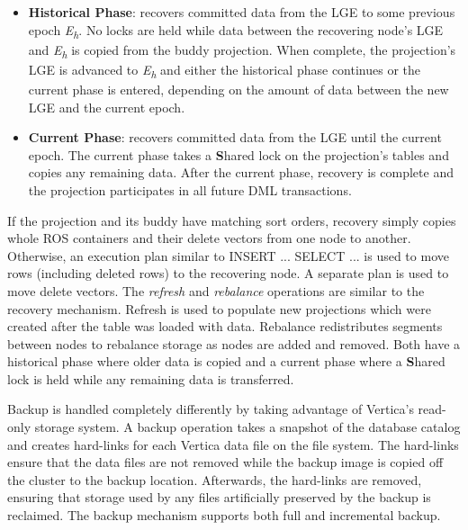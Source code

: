 \documentclass[a4paper,12pt,notitlepage,twoside,openright]{article}
\begin{document}
\begin{itemize}
\item

  \textbf{Historical Phase}: recovers committed data from the LGE to
  some previous epoch \emph{E\textsubscript{h}}. No locks are held while
  data between the recovering node's LGE and \emph{E\textsubscript{h
  }}is copied from the buddy projection. When complete, the projection's
  LGE is advanced to \emph{E\textsubscript{h }}and either the historical
  phase continues or the current phase is entered, depending on the
  amount of data between the new LGE and the current epoch.

\item

  \textbf{Current Phase}: recovers committed data from the LGE until the
  current epoch. The current phase takes a \textbf{S}hared lock on the
  projection's tables and copies any remaining data. After the current
  phase, recovery is complete and the projection participates in all
  future DML transactions.

\end{itemize}

If the projection and its buddy have matching sort orders, recovery
simply copies whole ROS containers and their delete vectors from one
node to another. Otherwise, an execution plan similar to INSERT ...
SELECT ... is used to move rows (including deleted rows) to the
recovering node. A separate plan is used to move delete vectors. The
\emph{refresh} and \emph{rebalance} operations are similar to the
recovery mechanism. Refresh is used to populate new projections which
were created after the table was loaded with data. Rebalance
redistributes segments between nodes to rebalance storage as nodes are
added and removed. Both have a historical phase where older data is
copied and a current phase where a \textbf{S}hared lock is held while
any remaining data is transferred.

Backup is handled completely differently by taking advantage of
Vertica's read-only storage system. A backup operation takes a snapshot
of the database catalog and creates hard-links for each Vertica data
file on the file system. The hard-links ensure that the data files are
not removed while the backup image is copied off the cluster to the
backup location. Afterwards, the hard-links are removed, ensuring that
storage used by any files artificially preserved by the backup is
reclaimed. The backup mechanism supports both full and incremental
backup.
\end{document}
